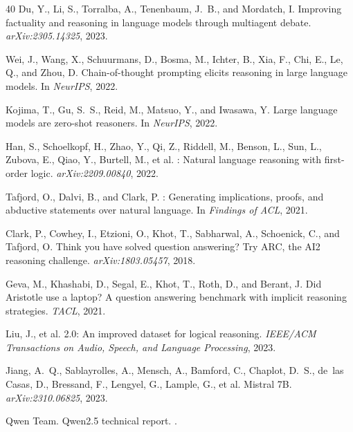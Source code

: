 \documentclass[11pt,a4paper]{article}
\begin{document}
\begin{thebibliography}{40}
Du, Y., Li, S., Torralba, A., Tenenbaum, J.~B., and Mordatch, I.
\newblock Improving factuality and reasoning in language models through multiagent debate.
\newblock \emph{arXiv:2305.14325}, 2023.

Wei, J., Wang, X., Schuurmans, D., Bosma, M., Ichter, B., Xia, F., Chi, E., Le, Q., and Zhou, D.
\newblock Chain-of-thought prompting elicits reasoning in large language models.
\newblock In \emph{NeurIPS}, 2022.

Kojima, T., Gu, S.~S., Reid, M., Matsuo, Y., and Iwasawa, Y.
\newblock Large language models are zero-shot reasoners.
\newblock In \emph{NeurIPS}, 2022.

Han, S., Schoelkopf, H., Zhao, Y., Qi, Z., Riddell, M., Benson, L., Sun, L., Zubova, E., Qiao, Y., Burtell, M., et al.
: Natural language reasoning with first-order logic.
\newblock \emph{arXiv:2209.00840}, 2022.

Tafjord, O., Dalvi, B., and Clark, P.
: Generating implications, proofs, and abductive statements over natural language.
\newblock In \emph{Findings of ACL}, 2021.

Clark, P., Cowhey, I., Etzioni, O., Khot, T., Sabharwal, A., Schoenick, C., and Tafjord, O.
\newblock Think you have solved question answering? {T}ry {ARC}, the {AI2} reasoning challenge.
\newblock \emph{arXiv:1803.05457}, 2018.

Geva, M., Khashabi, D., Segal, E., Khot, T., Roth, D., and Berant, J.
\newblock Did {A}ristotle use a laptop? {A} question answering benchmark with implicit reasoning strategies.
\newblock \emph{TACL}, 2021.

Liu, J., et al.
 2.0: An improved dataset for logical reasoning.
\newblock \emph{IEEE/ACM Transactions on Audio, Speech, and Language Processing}, 2023.

Jiang, A.~Q., Sablayrolles, A., Mensch, A., Bamford, C., Chaplot, D.~S., de~las Casas, D., Bressand, F., Lengyel, G., Lample, G., et al.
\newblock Mistral 7{B}.
\newblock \emph{arXiv:2310.06825}, 2023.

{Qwen Team}.
\newblock Qwen2.5 technical report.
.


\end{thebibliography}
\end{document}
